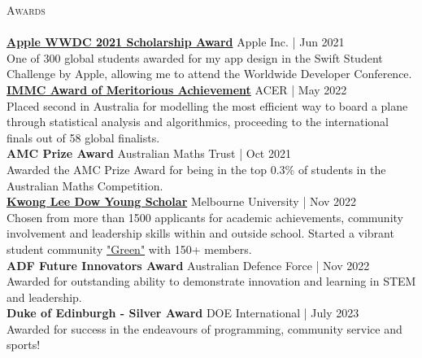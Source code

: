 \documentclass[a4paper]{article}
\newcommand{\lineunder} {
    \vspace*{-8pt} \\
    \hspace*{-18pt} \hrulefill \\
}
\newcommand{\header} [1] {
    {\hspace*{-18pt}\vspace*{6pt} \textsc{#1}}
    \vspace*{-6pt} \lineunder
}
\begin{document}
\header{Awards}
\href{https://www.wwdcscholars.com/s/DF1A5147-A993-44E4-8739-8A050139A7BA/2021}{\textbf{Apple WWDC 2021 Scholarship Award}} \hfill Apple Inc. | Jun 2021\\
One of 300 global students awarded for my app design in the Swift Student Challenge by Apple, allowing me to attend the Worldwide Developer Conference.\\
\vspace*{2mm}
\href{https://www.acer.org/au/discover/article/bray-park-and-caulfield-grammar-schools-top-maths-challenge}{\textbf{IMMC Award of Meritorious Achievement}} \hfill ACER | May 2022\\
Placed second in Australia for modelling the most efficient way to board a plane through statistical analysis and algorithmics, proceeding to the international finals out of 58 global finalists.\\
\vspace*{2mm}
\textbf{AMC Prize Award} \hfill Australian Maths Trust | Oct 2021\\
Awarded the AMC Prize Award for being in the top 0.3\% of students in the Australian Maths Competition.\\
\vspace*{2mm}
\href{https://www.linkedin.com/posts/caulfield-grammar-school_caulfieldgrammar2022-activity-7001816876439781376-DZpH}{\textbf{Kwong Lee Dow Young Scholar}} \hfill Melbourne University | Nov 2022\\
Chosen from more than 1500 applicants for academic achievements, community involvement and leadership skills within and outside school.
Started a vibrant student community \href{https://garv-shah.github.io/green/}{"Green"} with 150+ members.\\
\vspace*{2mm}
\textbf{ADF Future Innovators Award} \hfill Australian Defence Force | Nov 2022\\
Awarded for outstanding ability to demonstrate innovation and learning in STEM and leadership.\\
\textbf{Duke of Edinburgh - Silver Award} \hfill DOE International | July 2023\\
Awarded for success in the endeavours of programming, community service and sports!\\
\vspace*{2mm}
\end{document}

